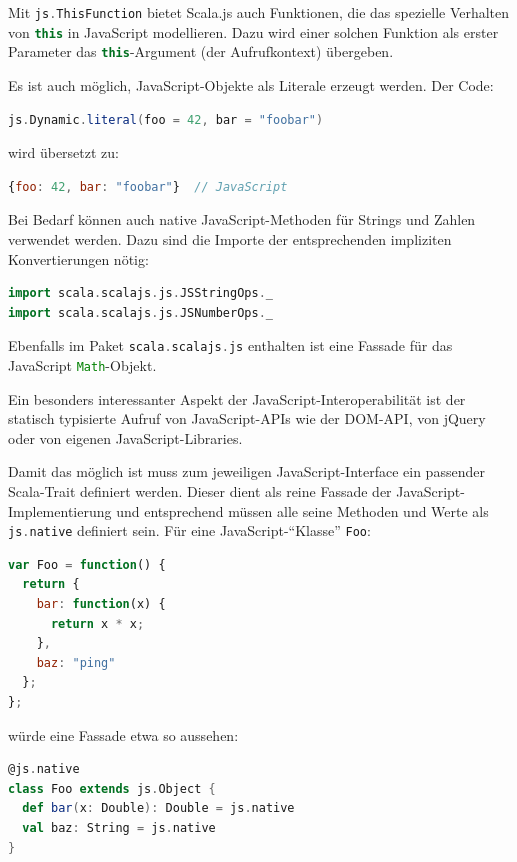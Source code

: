 \documentclass[a4paper, 12pt, hidelinks, listof=totoc, listoftables=totoc, bibliography=totoc]{scrreprt}
\newcommand{\code}[1]{\lstinline[language=Scala, style=inline]|#1|}
\newcommand{\scala}[1]{\lstinline[language=Scala, style=inline]|#1|}
\newcommand{\js}[1]{\lstinline[language=JavaScript, style=inline]|#1|}
\begin{document}
Mit \scala{js.ThisFunction} bietet Scala.js auch Funktionen, die das spezielle Verhalten von \js{this} in JavaScript modellieren. Dazu wird einer solchen Funktion als erster Parameter das \js{this}-Argument (der Aufrufkontext) übergeben.

Es ist auch möglich, JavaScript-Objekte als Literale erzeugt werden. Der Code:
\begin{lstlisting}[language=Scala, style=snippet]
js.Dynamic.literal(foo = 42, bar = "foobar")
\end{lstlisting}
wird übersetzt zu:
\begin{lstlisting}[language=JavaScript, style=snippet]
{foo: 42, bar: "foobar"}  // JavaScript
\end{lstlisting}

Bei Bedarf können auch native JavaScript-Methoden für Strings und Zahlen verwendet werden. Dazu sind die Importe der entsprechenden impliziten Konvertierungen nötig:
\begin{lstlisting}[language=Scala, style=snippet]
import scala.scalajs.js.JSStringOps._
import scala.scalajs.js.JSNumberOps._
\end{lstlisting}

Ebenfalls im Paket \scala{scala.scalajs.js} enthalten ist eine Fassade für das JavaScript \js{Math}-Objekt.

Ein besonders interessanter Aspekt der JavaScript-Interoperabilität ist der statisch typisierte Aufruf von JavaScript-APIs wie der DOM-API, von jQuery oder von eigenen JavaScript-Libraries.

Damit das möglich ist muss zum jeweiligen JavaScript-Interface ein passender Scala-Trait definiert werden. Dieser dient als reine Fassade der JavaScript-Implementierung und entsprechend müssen alle seine Methoden und Werte als \scala{js.native} definiert sein. Für eine JavaScript-"`Klasse"' \code{Foo}:

\begin{lstlisting}[language=JavaScript, style=snippet]
var Foo = function() {
  return {
    bar: function(x) {
      return x * x;
    },
    baz: "ping"
  };
};
\end{lstlisting}

würde eine Fassade etwa so aussehen:

\begin{lstlisting}[language=Scala, style=snippet]
@js.native
class Foo extends js.Object {
  def bar(x: Double): Double = js.native
  val baz: String = js.native
}
\end{lstlisting}
\end{document}
